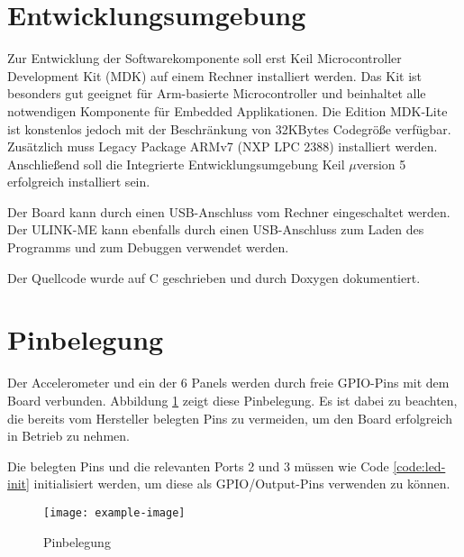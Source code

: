 \section{Entwicklungsumgebung}
Zur Entwicklung der Softwarekomponente soll erst Keil\textsuperscript{\scriptsize\textregistered} Microcontroller Development Kit (MDK) auf einem Rechner installiert werden. Das Kit ist besonders gut geeignet für Arm\textsuperscript{\scriptsize\textregistered}-basierte Microcontroller und beinhaltet alle notwendigen Komponente für Embedded Applikationen. Die Edition MDK-Lite ist konstenlos jedoch mit der Beschränkung von 32KBytes Codegröße verfügbar. Zusätzlich muss Legacy Package ARMv7 (NXP LPC 2388) installiert werden. Anschließend soll die Integrierte Entwicklungsumgebung Keil $\mu$version 5 erfolgreich installiert sein.

Der Board kann durch einen USB-Anschluss vom Rechner eingeschaltet werden. Der ULINK-ME kann ebenfalls durch einen USB-Anschluss zum Laden des Programms und zum Debuggen verwendet werden.

Der Quellcode wurde auf C geschrieben und durch Doxygen dokumentiert.


\section{Pinbelegung}
Der Accelerometer und ein der 6 Panels werden durch freie GPIO-Pins mit dem Board verbunden. Abbildung \ref{fig:pins} zeigt diese Pinbelegung. Es ist dabei zu beachten, die bereits vom Hersteller belegten Pins zu vermeiden, um den Board erfolgreich in Betrieb zu nehmen.

Die belegten Pins und die relevanten Ports 2 und 3 müssen wie Code \ref{code:led-init} initialisiert werden, um diese als GPIO/Output-Pins verwenden zu können.

\begin{figure}
	\centering
	\texttt{[image: example-image]}
	\caption[Pinbelegung]{Pinbelegung}
	\label{fig:pins}
\end{figure}

\newpage